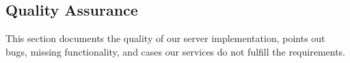 \subsection{Quality Assurance}
This section documents the quality of our server implementation, points out bugs, missing functionality, and cases our services do not fulfill the requirements.



\newpage
